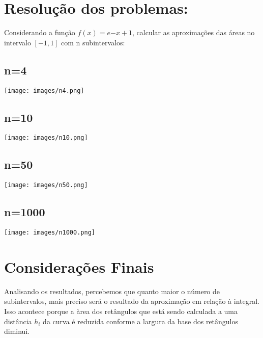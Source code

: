 \documentclass{article}
\begin{document}
	\section{Resolução dos problemas:}
		Considerando a função $f(x) = e{-x}+1$, calcular as aproximações das áreas no intervalo $[-1,1]$ com n subintervalos:
		\subsection{n=4}
			\texttt{[image: images/n4.png]}
		\subsection{n=10}
			\texttt{[image: images/n10.png]}
		\subsection{n=50}
			\texttt{[image: images/n50.png]}
		\subsection{n=1000}
			\texttt{[image: images/n1000.png]}
	\section{Considerações Finais}
		Analisando os resultados, percebemos que quanto maior o número de subintervalos, mais preciso será o resultado da aproximação em relação à integral. Isso acontece porque a àrea dos retângulos que está sendo calculada a uma distância $h_i$ da curva é reduzida conforme a largura da base dos retângulos diminui.
		
\end{document}
